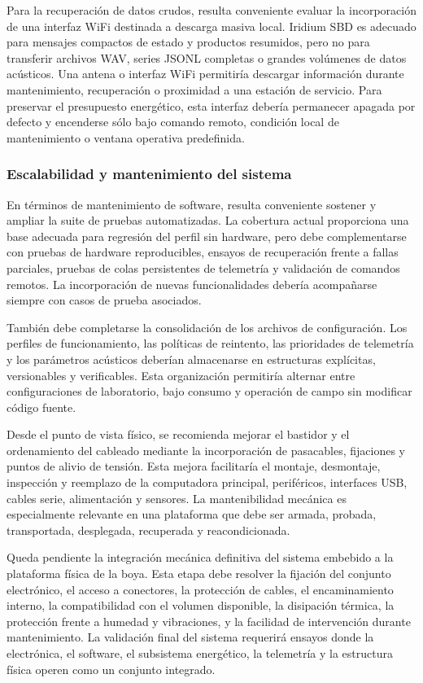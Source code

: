 Para la recuperación de datos crudos, resulta conveniente evaluar la incorporación de una interfaz WiFi destinada a descarga masiva local. Iridium SBD es adecuado para mensajes compactos de estado y productos resumidos, pero no para transferir archivos WAV, series JSONL completas o grandes volúmenes de datos acústicos. Una antena o interfaz WiFi permitiría descargar información durante mantenimiento, recuperación o proximidad a una estación de servicio. Para preservar el presupuesto energético, esta interfaz debería permanecer apagada por defecto y encenderse sólo bajo comando remoto, condición local de mantenimiento o ventana operativa predefinida.

\subsubsection{Escalabilidad y mantenimiento del sistema}

En términos de mantenimiento de software, resulta conveniente sostener y ampliar la suite de pruebas automatizadas. La cobertura actual proporciona una base adecuada para regresión del perfil sin hardware, pero debe complementarse con pruebas de hardware reproducibles, ensayos de recuperación frente a fallas parciales, pruebas de colas persistentes de telemetría y validación de comandos remotos. La incorporación de nuevas funcionalidades debería acompañarse siempre con casos de prueba asociados.

También debe completarse la consolidación de los archivos de configuración. Los perfiles de funcionamiento, las políticas de reintento, las prioridades de telemetría y los parámetros acústicos deberían almacenarse en estructuras explícitas, versionables y verificables. Esta organización permitiría alternar entre configuraciones de laboratorio, bajo consumo y operación de campo sin modificar código fuente.

Desde el punto de vista físico, se recomienda mejorar el bastidor y el ordenamiento del cableado mediante la incorporación de pasacables, fijaciones y puntos de alivio de tensión. Esta mejora facilitaría el montaje, desmontaje, inspección y reemplazo de la computadora principal, periféricos, interfaces USB, cables serie, alimentación y sensores. La mantenibilidad mecánica es especialmente relevante en una plataforma que debe ser armada, probada, transportada, desplegada, recuperada y reacondicionada.

Queda pendiente la integración mecánica definitiva del sistema embebido a la plataforma física de la boya. Esta etapa debe resolver la fijación del conjunto electrónico, el acceso a conectores, la protección de cables, el encaminamiento interno, la compatibilidad con el volumen disponible, la disipación térmica, la protección frente a humedad y vibraciones, y la facilidad de intervención durante mantenimiento. La validación final del sistema requerirá ensayos donde la electrónica, el software, el subsistema energético, la telemetría y la estructura física operen como un conjunto integrado.

